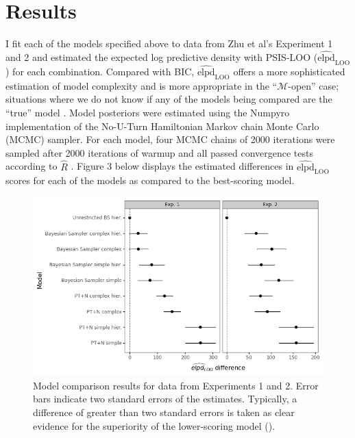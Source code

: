 \documentclass[
  english,
  man,floatsintext]{apa6}
\begin{document}
\hypertarget{results}{%
\section{Results}\label{results}}

I fit each of the models specified above to data from Zhu et al's \autocite*{zhu.etal2020} Experiment 1 and 2 and estimated the expected log predictive density with PSIS-LOO (\(\widehat{\text{elpd}}_{\text{LOO}}\)) for each combination. Compared with BIC, \(\widehat{\text{elpd}}_{\text{LOO}}\) offers a more sophisticated estimation of model complexity and is more appropriate in the ``\(\mathcal{M}\)-open'' case; situations where we do not know if any of the models being compared are the ``true'' model \autocite{vehtari.etal2019}. Model posteriors were estimated using the Numpyro \autocite{phan.etal2019} implementation of the No-U-Turn Hamiltonian Markov chain Monte Carlo (MCMC) sampler. For each model, four MCMC chains of 2000 iterations were sampled after 2000 iterations of warmup and all passed convergence tests according to \(\hat{R}\) \autocite[see][]{gelman.etal2014a}. Figure 3 below displays the estimated differences in \(\widehat{\text{elpd}}_{\text{LOO}}\) scores for each of the models as compared to the best-scoring model.

\begin{figure}[ht]
\centering
\includegraphics[width=6in]{plot_compare.png}
\caption[]{Model comparison results for data from Experiments 1 and 2. Error bars indicate two standard errors of the estimates. Typically, a difference of greater than two standard errors is taken as clear evidence for the superiority of the lower-scoring model (\cite{sivula.etal2020}).}
\end{figure}
\end{document}
